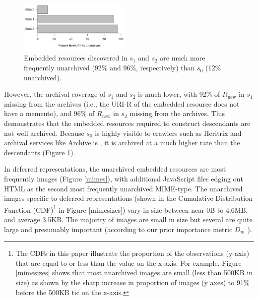 \documentclass{sig-alternate}
\begin{document}
\begin{figure}
\centering
\includegraphics[width=0.48\textwidth]{./imgs/archivedByDepthPctHorz.png}
\caption{Embedded resources discovered in $s_1$ and $s_2$ are much more frequently unarchived (92\% and 96\%, respectively) than $s_0$ (12\% unarchived).}
\label{depth}
\end{figure}


However, the archival coverage of $s_1$ and $s_2$ is much lower, with 92\% of $R_{\text{new}}$ in $s_1$ missing from the archives (i.e., the URI-R of the embedded resource does not have a memento), and 96\% of $R_{\text{new}}$ in $s_2$ missing from the archives. This demonstrates that the embedded resources required to construct descendants are not well archived. Because $s_0$ is highly visible to crawlers such as Heritrix and archival services like Archive.is \cite{archivetoday}, it is archived at a much higher rate than the descendants (Figure \ref{depth}).



In deferred representations, the unarchived embedded resources are most frequently images (Figure \ref{mimes}), with additional JavaScript files edging out HTML as the second most frequently unarchived MIME-type. The unarchived images specific to deferred representations (shown in the Cumulative Distribution Function (CDF)\footnote{The CDFs in this paper illustrate the proportion of the observations (y-axis) that are equal to or less than the value on the x-axis. For example, Figure \ref{mimesizes} shows that most unarchived images are small (less than 500KB in size) as shown by the sharp increase in proportion of images (y axes) to 91\% before the 500KB tic on the x-axis.} in Figure \ref{mimesizes}) vary in size between near 0B to 4.6MB, and average 3.5KB. The majority of images are small in size but several are quite large and presumably important (according to our prior importance metric $D_m$ \cite{damageIJDL}).




\end{document}
